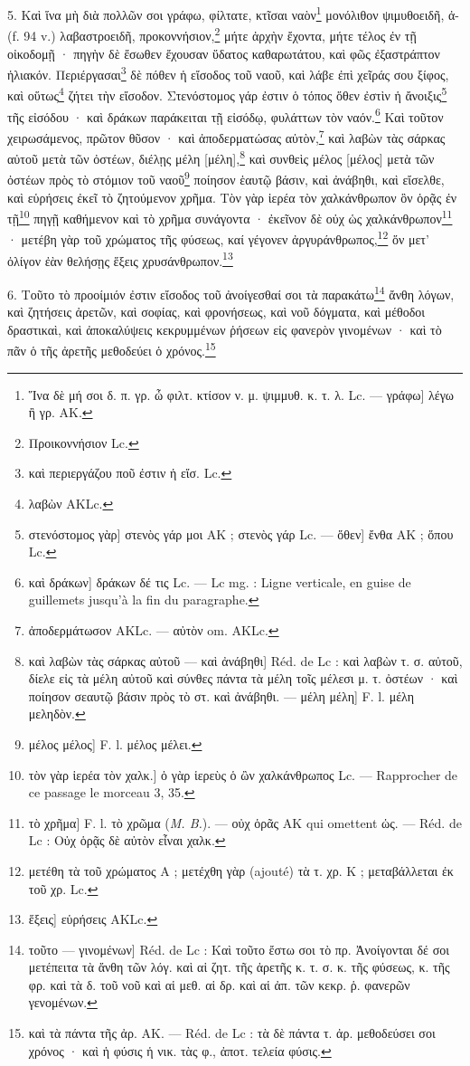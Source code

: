 \documentclass[landscape, a4paper, 11pt, oneside, polutonikogreek, french]{article}
\begin{document}
5. Καὶ ἵνα μὴ διὰ πολλῶν σοι γράφω, φίλτατε, κτῖσαι ναὸν\footnote{Ἵνα δὲ μή σοι δ. π. γρ. ὦ φιλτ. κτίσον ν. μ. ψιμμυθ. κ. τ. λ. Lc. --- γράφω] λέγω ἢ γρ. AK.} μονόλιθον ψιμυθοειδῆ, ἀ- (f. 94 v.) λαβαστροειδῆ, προκοννήσιον,\footnote{Προικοννήσιον Lc.} μήτε ἀρχὴν ἔχοντα, μήτε τέλος ἐν τῇ οἰκοδομῇ · πηγὴν δὲ ἔσωθεν ἔχουσαν ὕδατος καθαρωτάτου, καὶ φῶς ἐξαστράπτον ἡλιακόν. Περιέργασαι\footnote{καὶ περιεργάζου ποῦ ἐστιν ἡ εἴσ. Lc.} δὲ πόθεν ἡ εἴσοδος τοῦ ναοῦ, καὶ λάβε ἐπὶ χεῖράς σου ξίφος, καὶ οὕτως\footnote{λαβὼν AKLc.} ζήτει τὴν εἴσοδον. Στενόστομος γάρ ἐστιν ὁ τόπος ὅθεν ἐστὶν ἡ ἄνοιξις\footnote{στενόστομος γὰρ] στενὸς γάρ μοι AK ; στενὸς γάρ Lc. --- ὅθεν] ἔνθα AK ; ὅπου Lc.} τῆς εἰσόδου · καὶ δράκων παράκειται τῇ εἰσόδῳ, φυλάττων τὸν ναόν.\footnote{καὶ δράκων] δράκων δέ τις Lc. --- Lc mg. : Ligne verticale, en guise de guillemets jusqu'à la fin du paragraphe.} Καὶ τοῦτον χειρωσάμενος, πρῶτον θῦσον · καὶ ἀποδερματώσας αὐτὸν,\footnote{ἀποδερμάτωσον AKLc. --- αὐτὸν om. AKLc.} καὶ λαβὼν τὰς σάρκας αὐτοῦ μετὰ τῶν ὀστέων, διέλῃς μέλη [μέλη],\footnote{καὶ λαβὼν τὰς σάρκας αὐτοῦ --- καὶ ἀνάβηθι] Réd. de Lc : καὶ λαβὼν τ. σ. αὐτοῦ, δίελε εἰς τὰ μέλη αὐτοῦ καὶ σύνθες πάντα τὰ μέλη τοῖς μέλεσι μ. τ. ὀστέων · καὶ ποίησον σεαυτῷ βάσιν πρὸς τὸ στ. καὶ ἀνάβηθι. --- μέλη μέλη] F. l. μέλη μεληδὸν.} καὶ συνθεὶς μέλος [μέλος] μετὰ τῶν ὀστέων πρὸς τὸ στόμιον τοῦ ναοῦ\footnote{μέλος μέλος] F. l. μέλος μέλει.} ποίησον ἑαυτῷ βάσιν, καὶ ἀνάβηθι, καὶ εἴσελθε, καὶ εὑρήσεις ἐκεῖ τὸ ζητούμενον χρῆμα. Τὸν γὰρ ἱερέα τὸν χαλκάνθρωπον ὃν ὁρᾷς ἐν τῇ\footnote{τὸν γὰρ ἱερέα τὸν χαλκ.] ὁ γὰρ ἱερεὺς ὁ ὢν χαλκάνθρωπος Lc. --- Rapprocher de ce passage le morceau 3, 35.} πηγῇ καθήμενον καὶ τὸ χρῆμα συνάγοντα · ἐκεῖνον δὲ οὐχ ὡς χαλκάνθρωπον\footnote{τὸ χρῆμα] F. l. τὸ χρῶμα (\emph{M. B.}). --- οὐχ ὁρᾶς AK qui omettent ὡς. --- Réd. de Lc : Οὐχ ὁρᾷς δὲ αὐτὸν εἶναι χαλκ.} · μετέβη γὰρ τοῦ χρώματος τῆς φύσεως, καί γέγονεν ἀργυράνθρωπος,\footnote{μετέθη τὰ τοῦ χρώματος A ; μετέχθη γὰρ (ajouté) τὰ τ. χρ. K ; μεταβάλλεται ἐκ τοῦ χρ. Lc.} ὅν μετ' ὀλίγον ἐὰν θελήσῃς ἕξεις χρυσάνθρωπον.\footnote{ἕξεις] εὑρήσεις AKLc.}

6. Τοῦτο τὸ προοίμιόν ἐστιν εἴσοδος τοῦ ἀνοίγεσθαί σοι τὰ παρακάτω\footnote{τοῦτο --- γινομένων] Réd. de Lc : Καὶ τοῦτο ἔστω σοι τὸ πρ. Ἀνοίγονται δέ σοι μετέπειτα τὰ ἄνθη τῶν λόγ. καὶ αἱ ζητ. τῆς ἀρετῆς κ. τ. σ. κ. τῆς φύσεως, κ. τῆς φρ. καὶ τὰ δ. τοῦ νοῦ καὶ αἱ μεθ. αἱ δρ. καὶ αἱ ἀπ. τῶν κεκρ. ῥ. φανερῶν γενομένων.} ἄνθη λόγων, καὶ ζητήσεις ἀρετῶν, καὶ σοφίας, καὶ φρονήσεως, καὶ νοῦ δόγματα, καὶ μέθοδοι δραστικαὶ, καὶ ἀποκαλύψεις κεκρυμμένων ῥήσεων εἰς φανερὸν γινομένων · καὶ τὸ πᾶν ὁ τῆς ἀρετῆς μεθοδεύει ὁ χρόνος.\footnote{καὶ τὰ πάντα τῆς ἀρ. AK. --- Réd. de Lc : τὰ δὲ πάντα τ. ἀρ. μεθοδεύσει σοι χρόνος · καὶ ἡ φύσις ἡ νικ. τὰς φ., ἀποτ. τελεία φύσις.}
\end{document}

